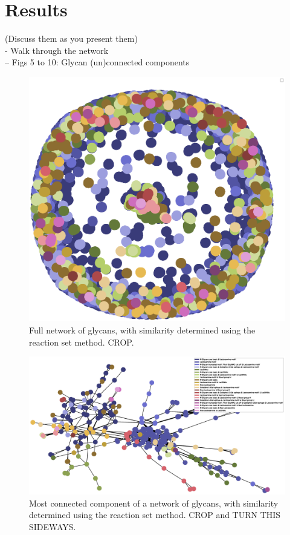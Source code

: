 \documentclass[12pt,a4paper]{article}
\begin{document}
\newpage
\section{Results}
\label{sec:results}
(Discuss them as you present them)\\

- Walk through the network\\
-- Figs 5 to 10: Glycan (un)connected components\\

\begin{figure}[H]
\centering 
\includegraphics[scale=0.5]{threshold_87_conn_comp_1_method_set/threshold_87_full_network_method_set.eps} 
\caption{Full network of glycans, with similarity determined using the reaction set method. CROP.}
\label{fig:threshold_87_full_network_method_set}
\end{figure}

\begin{figure}[H]
\centering 
\includegraphics[scale=0.3]{threshold_87_conn_comp_1_method_set/threshold_87_conn_comp_1_method_set.eps} 
\caption{Most connected component of a network of glycans, with similarity determined using the reaction set method. CROP and TURN THIS SIDEWAYS.}
\label{fig:threshold_87_conn_comp_1_method_set}
\end{figure}
\end{document}
